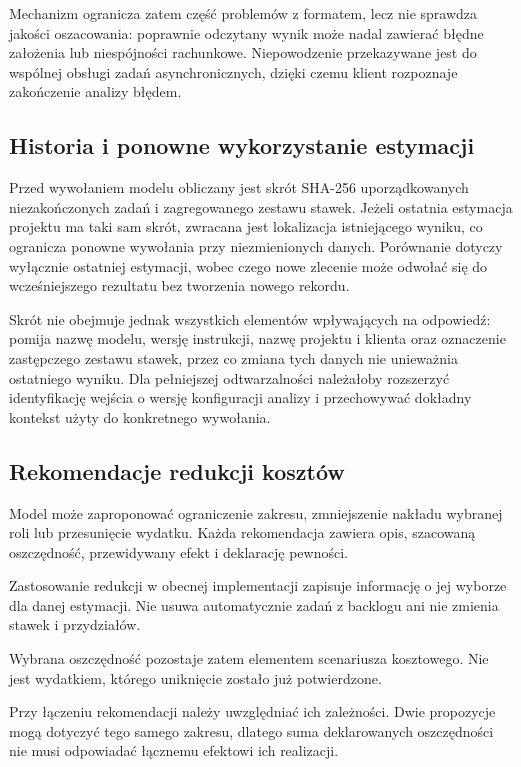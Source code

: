 Mechanizm ogranicza zatem część problemów z formatem, lecz nie sprawdza jakości oszacowania: poprawnie odczytany wynik może nadal zawierać błędne założenia lub niespójności rachunkowe. Niepowodzenie przekazywane jest do wspólnej obsługi zadań asynchronicznych, dzięki czemu klient rozpoznaje zakończenie analizy błędem.

\subsection{Historia i ponowne wykorzystanie estymacji}

Przed wywołaniem modelu obliczany jest skrót SHA-256 uporządkowanych niezakończonych zadań i zagregowanego zestawu stawek. Jeżeli ostatnia estymacja projektu ma taki sam skrót, zwracana jest lokalizacja istniejącego wyniku, co ogranicza ponowne wywołania przy niezmienionych danych. Porównanie dotyczy wyłącznie ostatniej estymacji, wobec czego nowe zlecenie może odwołać się do wcześniejszego rezultatu bez tworzenia nowego rekordu.

Skrót nie obejmuje jednak wszystkich elementów wpływających na odpowiedź: pomija nazwę modelu, wersję instrukcji, nazwę projektu i klienta oraz oznaczenie zastępczego zestawu stawek, przez co zmiana tych danych nie unieważnia ostatniego wyniku. Dla pełniejszej odtwarzalności należałoby rozszerzyć identyfikację wejścia o wersję konfiguracji analizy i przechowywać dokładny kontekst użyty do konkretnego wywołania.

\subsection{Rekomendacje redukcji kosztów}

Model może zaproponować ograniczenie zakresu, zmniejszenie nakładu wybranej roli lub przesunięcie wydatku. Każda rekomendacja zawiera opis, szacowaną oszczędność, przewidywany efekt i deklarację pewności.

Zastosowanie redukcji w obecnej implementacji zapisuje informację o jej wyborze dla danej estymacji. Nie usuwa automatycznie zadań z backlogu ani nie zmienia stawek i przydziałów.

Wybrana oszczędność pozostaje zatem elementem scenariusza kosztowego. Nie jest wydatkiem, którego uniknięcie zostało już potwierdzone.

Przy łączeniu rekomendacji należy uwzględniać ich zależności. Dwie propozycje mogą dotyczyć tego samego zakresu, dlatego suma deklarowanych oszczędności nie musi odpowiadać łącznemu efektowi ich realizacji.

